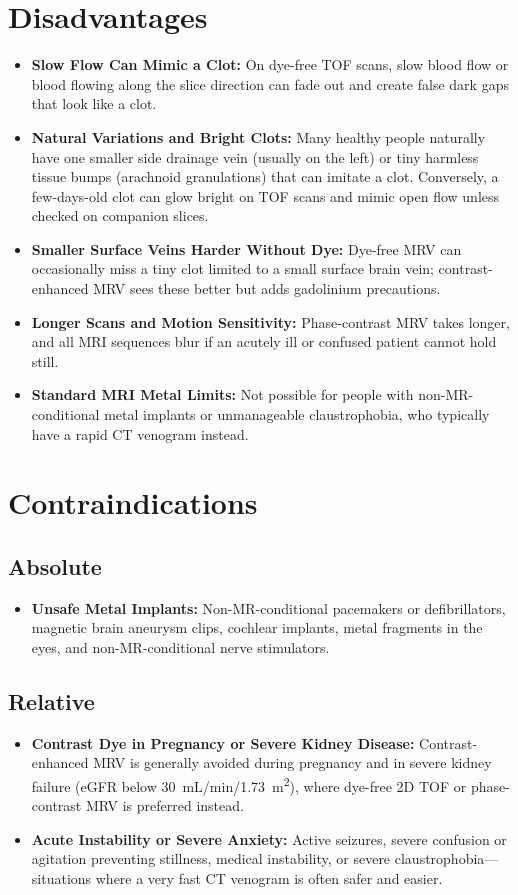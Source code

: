 \section{Disadvantages}
\begin{itemize}
\item \textbf{Slow Flow Can Mimic a Clot:} On dye-free TOF scans, slow blood flow or blood flowing along the slice direction can fade out and create false dark gaps that look like a clot.
\item \textbf{Natural Variations and Bright Clots:} Many healthy people naturally have one smaller side drainage vein (usually on the left) or tiny harmless tissue bumps (arachnoid granulations) that can imitate a clot. Conversely, a few-days-old clot can glow bright on TOF scans and mimic open flow unless checked on companion slices.
\item \textbf{Smaller Surface Veins Harder Without Dye:} Dye-free MRV can occasionally miss a tiny clot limited to a small surface brain vein; contrast-enhanced MRV sees these better but adds gadolinium precautions.
\item \textbf{Longer Scans and Motion Sensitivity:} Phase-contrast MRV takes longer, and all MRI sequences blur if an acutely ill or confused patient cannot hold still.
\item \textbf{Standard MRI Metal Limits:} Not possible for people with non-MR-conditional metal implants or unmanageable claustrophobia, who typically have a rapid CT venogram instead.
\end{itemize}

\section{Contraindications}

\subsection{Absolute}
\begin{itemize}
\item \textbf{Unsafe Metal Implants:} Non-MR-conditional pacemakers or defibrillators, magnetic brain aneurysm clips, cochlear implants, metal fragments in the eyes, and non-MR-conditional nerve stimulators.
\end{itemize}

\subsection{Relative}
\begin{itemize}
\item \textbf{Contrast Dye in Pregnancy or Severe Kidney Disease:} Contrast-enhanced MRV is generally avoided during pregnancy and in severe kidney failure (eGFR below 30~mL/min/1.73~m\textsuperscript{2}), where dye-free 2D TOF or phase-contrast MRV is preferred instead.
\item \textbf{Acute Instability or Severe Anxiety:} Active seizures, severe confusion or agitation preventing stillness, medical instability, or severe claustrophobia---situations where a very fast CT venogram is often safer and easier.
\end{itemize}

